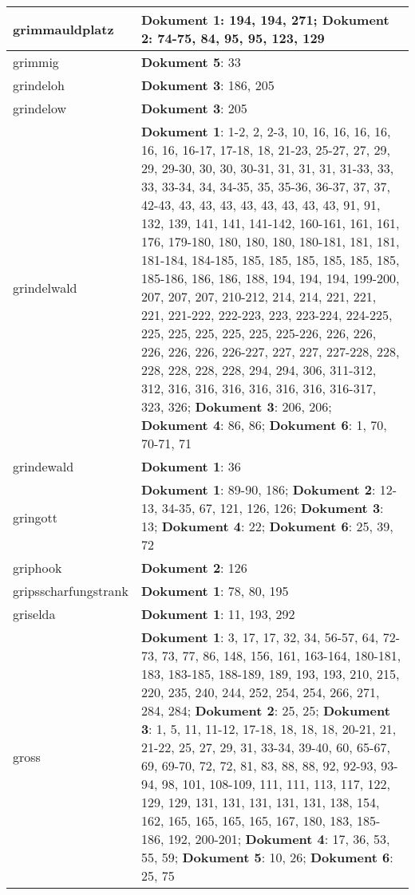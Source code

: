 \documentclass[a5paper]{article}
\begin{document}
\begin{longtable}[l]{|l|p{3in}|}
\hline
grimmauldplatz & \textbf{Dokument 1}: 194, 194, 271; \textbf{Dokument 2}: 74-75, 84, 95, 95, 123, 129 \\
\hline
grimmig & \textbf{Dokument 5}: 33 \\
\hline
grindeloh & \textbf{Dokument 3}: 186, 205 \\
\hline
grindelow & \textbf{Dokument 3}: 205 \\
\hline
grindelwald & \textbf{Dokument 1}: 1-2, 2, 2-3, 10, 16, 16, 16, 16, 16, 16, 16-17, 17-18, 18, 21-23, 25-27, 27, 29, 29, 29-30, 30, 30, 30-31, 31, 31, 31, 31-33, 33, 33, 33-34, 34, 34-35, 35, 35-36, 36-37, 37, 37, 42-43, 43, 43, 43, 43, 43, 43, 43, 43, 91, 91, 132, 139, 141, 141, 141-142, 160-161, 161, 161, 176, 179-180, 180, 180, 180, 180-181, 181, 181, 181-184, 184-185, 185, 185, 185, 185, 185, 185, 185-186, 186, 186, 188, 194, 194, 194, 199-200, 207, 207, 207, 210-212, 214, 214, 221, 221, 221, 221-222, 222-223, 223, 223-224, 224-225, 225, 225, 225, 225, 225, 225-226, 226, 226, 226, 226, 226, 226-227, 227, 227, 227-228, 228, 228, 228, 228, 228, 294, 294, 306, 311-312, 312, 316, 316, 316, 316, 316, 316, 316-317, 323, 326; \textbf{Dokument 3}: 206, 206; \textbf{Dokument 4}: 86, 86; \textbf{Dokument 6}: 1, 70, 70-71, 71 \\
\hline
grindewald & \textbf{Dokument 1}: 36 \\
\hline
gringott & \textbf{Dokument 1}: 89-90, 186; \textbf{Dokument 2}: 12-13, 34-35, 67, 121, 126, 126; \textbf{Dokument 3}: 13; \textbf{Dokument 4}: 22; \textbf{Dokument 6}: 25, 39, 72 \\
\hline
griphook & \textbf{Dokument 2}: 126 \\
\hline
gripsscharfungstrank & \textbf{Dokument 1}: 78, 80, 195 \\
\hline
griselda & \textbf{Dokument 1}: 11, 193, 292 \\
\hline
gross & \textbf{Dokument 1}: 3, 17, 17, 32, 34, 56-57, 64, 72-73, 73, 77, 86, 148, 156, 161, 163-164, 180-181, 183, 183-185, 188-189, 189, 193, 193, 210, 215, 220, 235, 240, 244, 252, 254, 254, 266, 271, 284, 284; \textbf{Dokument 2}: 25, 25; \textbf{Dokument 3}: 1, 5, 11, 11-12, 17-18, 18, 18, 18, 20-21, 21, 21-22, 25, 27, 29, 31, 33-34, 39-40, 60, 65-67, 69, 69-70, 72, 72, 81, 83, 88, 88, 92, 92-93, 93-94, 98, 101, 108-109, 111, 111, 113, 117, 122, 129, 129, 131, 131, 131, 131, 131, 138, 154, 162, 165, 165, 165, 165, 167, 180, 183, 185-186, 192, 200-201; \textbf{Dokument 4}: 17, 36, 53, 55, 59; \textbf{Dokument 5}: 10, 26; \textbf{Dokument 6}: 25, 75 \\

\end{longtable}
\end{document}
